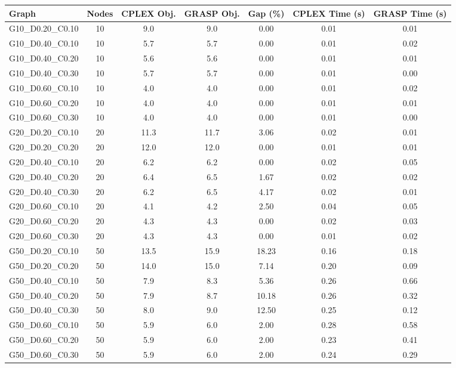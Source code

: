 \begin{tabular}{|l|c|c|c|c|c|c|}
\hline
\textbf{Graph} & \textbf{Nodes} & \textbf{CPLEX Obj.} & \textbf{GRASP Obj.} & \textbf{Gap (\%)} & \textbf{CPLEX Time (s)} & \textbf{GRASP Time (s)} \\
\hline
G10_D0.20_C0.10 & 
10 & 
9.0 & 
9.0 & 
0.00 & 
0.01 & 
0.01 \\
G10_D0.40_C0.10 & 
10 & 
5.7 & 
5.7 & 
0.00 & 
0.01 & 
0.02 \\
G10_D0.40_C0.20 & 
10 & 
5.6 & 
5.6 & 
0.00 & 
0.01 & 
0.01 \\
G10_D0.40_C0.30 & 
10 & 
5.7 & 
5.7 & 
0.00 & 
0.01 & 
0.00 \\
G10_D0.60_C0.10 & 
10 & 
4.0 & 
4.0 & 
0.00 & 
0.01 & 
0.02 \\
G10_D0.60_C0.20 & 
10 & 
4.0 & 
4.0 & 
0.00 & 
0.01 & 
0.01 \\
G10_D0.60_C0.30 & 
10 & 
4.0 & 
4.0 & 
0.00 & 
0.01 & 
0.00 \\
G20_D0.20_C0.10 & 
20 & 
11.3 & 
11.7 & 
3.06 & 
0.02 & 
0.01 \\
G20_D0.20_C0.20 & 
20 & 
12.0 & 
12.0 & 
0.00 & 
0.01 & 
0.01 \\
G20_D0.40_C0.10 & 
20 & 
6.2 & 
6.2 & 
0.00 & 
0.02 & 
0.05 \\
G20_D0.40_C0.20 & 
20 & 
6.4 & 
6.5 & 
1.67 & 
0.02 & 
0.02 \\
G20_D0.40_C0.30 & 
20 & 
6.2 & 
6.5 & 
4.17 & 
0.02 & 
0.01 \\
G20_D0.60_C0.10 & 
20 & 
4.1 & 
4.2 & 
2.50 & 
0.04 & 
0.05 \\
G20_D0.60_C0.20 & 
20 & 
4.3 & 
4.3 & 
0.00 & 
0.02 & 
0.03 \\
G20_D0.60_C0.30 & 
20 & 
4.3 & 
4.3 & 
0.00 & 
0.01 & 
0.02 \\
G50_D0.20_C0.10 & 
50 & 
13.5 & 
15.9 & 
18.23 & 
0.16 & 
0.18 \\
G50_D0.20_C0.20 & 
50 & 
14.0 & 
15.0 & 
7.14 & 
0.20 & 
0.09 \\
G50_D0.40_C0.10 & 
50 & 
7.9 & 
8.3 & 
5.36 & 
0.26 & 
0.66 \\
G50_D0.40_C0.20 & 
50 & 
7.9 & 
8.7 & 
10.18 & 
0.26 & 
0.32 \\
G50_D0.40_C0.30 & 
50 & 
8.0 & 
9.0 & 
12.50 & 
0.25 & 
0.12 \\
G50_D0.60_C0.10 & 
50 & 
5.9 & 
6.0 & 
2.00 & 
0.28 & 
0.58 \\
G50_D0.60_C0.20 & 
50 & 
5.9 & 
6.0 & 
2.00 & 
0.23 & 
0.41 \\
G50_D0.60_C0.30 & 
50 & 
5.9 & 
6.0 & 
2.00 & 
0.24 & 
0.29 \\
\hline
\end{tabular}
